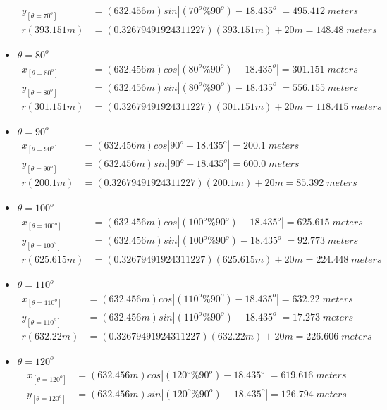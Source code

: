 \begin{itemize}
\begin{align*}
		y_{[\theta=70^o]} &=(632.456m) sin\left| (70^o\%90^o) - 18.435^o \right|  =495.412\;meters \\
		r(393.151m) &=(0.32679491924311227)(393.151m)+20m  =148.48\;meters\end{align*}
\item $\theta=80^o$
	\begin{align*}%
		x_{[\theta=80^o]} &=(632.456m) cos\left| (80^o\%90^o) - 18.435^o \right|  =301.151\;meters \\
		y_{[\theta=80^o]} &=(632.456m) sin\left| (80^o\%90^o) - 18.435^o \right|  =556.155\;meters \\
		r(301.151m) &=(0.32679491924311227)(301.151m)+20m  =118.415\;meters\end{align*}
\item $\theta=90^o$
	\begin{align*}%
		x_{[\theta=90^o]} &=(632.456m) cos\left| 90^o - 18.435^o \right|  =200.1\;meters \\
		y_{[\theta=90^o]} &=(632.456m) sin\left| 90^o - 18.435^o \right|  =600.0\;meters \\
		r(200.1m) &=(0.32679491924311227)(200.1m)+20m  =85.392\;meters\end{align*}
\item $\theta=100^o$
	\begin{align*}%
		x_{[\theta=100^o]} &=(632.456m) cos\left| (100^o\%90^o) - 18.435^o \right|  =625.615\;meters \\
		y_{[\theta=100^o]} &=(632.456m) sin\left| (100^o\%90^o) - 18.435^o \right|  =92.773\;meters \\
		r(625.615m) &=(0.32679491924311227)(625.615m)+20m  =224.448\;meters\end{align*}
\item $\theta=110^o$
	\begin{align*}%
		x_{[\theta=110^o]} &=(632.456m) cos\left| (110^o\%90^o) - 18.435^o \right|  =632.22\;meters \\
		y_{[\theta=110^o]} &=(632.456m) sin\left| (110^o\%90^o) - 18.435^o \right|  =17.273\;meters \\
		r(632.22m) &=(0.32679491924311227)(632.22m)+20m  =226.606\;meters\end{align*}
\item $\theta=120^o$
	\begin{align*}%
		x_{[\theta=120^o]} &=(632.456m) cos\left| (120^o\%90^o) - 18.435^o \right|  =619.616\;meters \\
		y_{[\theta=120^o]} &=(632.456m) sin\left| (120^o\%90^o) - 18.435^o \right|  =126.794\;meters \\

\end{align*}
\end{itemize}
